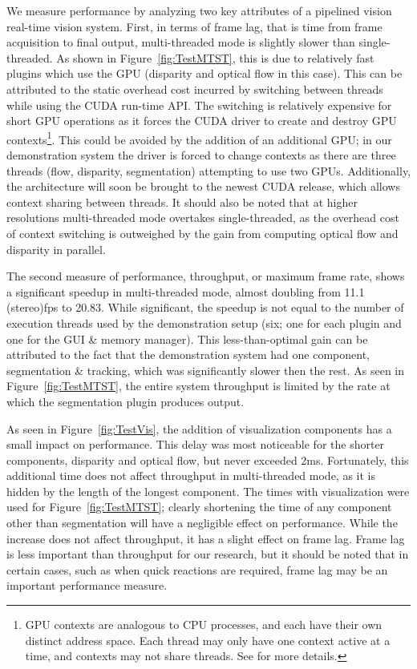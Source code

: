 We measure performance by analyzing two key attributes of a pipelined vision real-time vision system. First, in terms of frame lag, that is time from frame acquisition to final output, multi-threaded mode is slightly slower than single-threaded. As shown in Figure~\ref{fig:TestMTST}, this is due to relatively fast plugins which use the GPU (disparity and optical flow in this case). This can be attributed to the static overhead cost incurred by switching between threads while using the CUDA run-time API. The switching is relatively expensive for short GPU operations as it forces the CUDA driver to create and destroy GPU contexts\footnote{GPU contexts are analogous to CPU processes, and each have their own distinct address space. Each thread may only have one context active at a time, and contexts may not share threads. See \cite{NVIDIA_Fermi, NVIDIA_CUDA} for more details.}. This could be avoided by the addition of an additional GPU; in our demonstration system the driver is forced to change contexts as there 
are three threads (flow, disparity, segmentation) attempting to use two GPUs. Additionally, the architecture will soon be brought to the newest CUDA release, which allows context sharing between threads. It should also be noted that at higher resolutions multi-threaded mode overtakes single-threaded, as the overhead cost of context switching is outweighed by the gain from computing optical flow and disparity in parallel. 

The second measure of performance, throughput, or maximum frame rate, shows a significant speedup in multi-threaded mode, almost doubling from 11.1 (stereo)fps to 20.83. While significant, the speedup is not equal to the number of execution threads used by the demonstration setup (six; one for each plugin and one for the GUI \& memory manager). This less-than-optimal gain can be attributed to the fact that the demonstration system had one component, segmentation \& tracking, which was significantly slower then the rest. As seen in Figure~\ref{fig:TestMTST}, the entire system throughput is limited by the rate at which the segmentation plugin produces output. 

As seen in Figure~\ref{fig:TestVis}, the addition of visualization components has a small impact on performance. This delay was most noticeable for the shorter components, disparity and optical flow, but never exceeded 2ms. Fortunately, this additional time does not affect throughput in multi-threaded mode, as it is hidden by the length of the longest component. The times with visualization were used for Figure~\ref{fig:TestMTST}; clearly shortening the time of any component other than segmentation will have a negligible effect on performance. While the increase does not affect throughput, it has a slight effect on frame lag. Frame lag is less important than throughput for our research, but it should be noted that in certain cases, such as when quick reactions are required, frame lag may be an important performance measure. 

